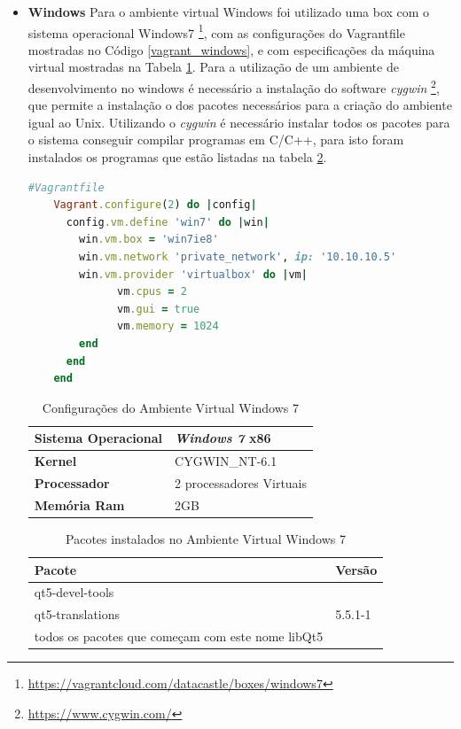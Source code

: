 \begin{itemize}
    \item \textbf{Windows}
        \subitem Para o ambiente virtual Windows foi utilizado uma box com
 o sistema operacional Windows7 \footnote{\url{https://vagrantcloud.com/datacastle/boxes/windows7}},
 com as configurações do Vagrantfile mostradas no Código \ref{vagrant_windows},
 e com especificações da máquina virtual mostradas na Tabela \ref{especificacoes_windows}.
 Para a utilização de um ambiente de desenvolvimento no windows é necessário a instalação
 do software \textit{cygwin} \footnote{\url{https://www.cygwin.com/}}, que permite a instalação
o dos pacotes necessários para a criação do ambiente igual ao Unix.
 Utilizando o \textit{cygwin} é necessário instalar todos os pacotes para o sistema 
conseguir compilar programas em C/C++, para isto foram instalados os programas 
que estão listadas na tabela \ref{pacotes_instalados_windows}.

\begin{lstlisting}[language=ruby, caption={Vagrantfile com configurações da máquina virtual Windows 7},
                  label=vagrant_windows]
    #Vagrantfile
    Vagrant.configure(2) do |config|
      config.vm.define 'win7' do |win|
        win.vm.box = 'win7ie8'
        win.vm.network 'private_network', ip: '10.10.10.5'
        win.vm.provider 'virtualbox' do |vm|
              vm.cpus = 2
              vm.gui = true
              vm.memory = 1024
        end
      end
    end
\end{lstlisting}

\begin{table}[h]
\centering
\caption{Configurações do Ambiente Virtual Windows 7}
\label{especificacoes_windows}
\begin{tabular}{ll}
\textbf{Sistema Operacional} & \textit{Windows 7} x86\\ \toprule
\textbf{Kernel} & CYGWIN\_NT-6.1  \\ \midrule 
\textbf{Processador} & 2 processadores Virtuais \\ \midrule
\textbf{Memória Ram} & 2GB  \\ \bottomrule 
\end{tabular} 
\end{table}


\begin{table}[h]
\centering
\caption{Pacotes instalados no Ambiente Virtual Windows 7}
\label{pacotes_instalados_windows}
\begin{tabular}{ll}
\textbf{Pacote} & \textbf{Versão} \\ \toprule
qt5-devel-tools  &  \\ 
qt5-translations & 5.5.1-1  \\ 
todos os pacotes que começam com este nome libQt5 & \\ \midrule


\end{tabular}
\end{table}
\end{itemize}
